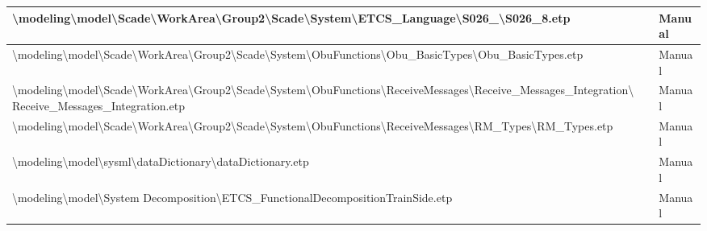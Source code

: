 \begin{longtable}{|>{\RaggedRight}p{}|>{\RaggedRight}p{}|>{\RaggedRight}p{}|}
\hline
\textbackslash \allowbreak modeling\textbackslash \allowbreak model\textbackslash \allowbreak Scade\textbackslash \allowbreak WorkArea\textbackslash \allowbreak Group2\textbackslash \allowbreak Scade\textbackslash \allowbreak System\textbackslash \allowbreak ETCS\_\allowbreak Language\textbackslash \allowbreak S026\_\allowbreak 8\textbackslash \allowbreak S026\_\allowbreak 8.etp& &Manual\\
\hline
\textbackslash \allowbreak modeling\textbackslash \allowbreak model\textbackslash \allowbreak Scade\textbackslash \allowbreak WorkArea\textbackslash \allowbreak Group2\textbackslash \allowbreak Scade\textbackslash \allowbreak System\textbackslash \allowbreak ObuFunctions\textbackslash \allowbreak Obu\_\allowbreak BasicTypes\textbackslash \allowbreak Obu\_\allowbreak BasicTypes.etp& &Manual\\
\hline
\textbackslash \allowbreak modeling\textbackslash \allowbreak model\textbackslash \allowbreak Scade\textbackslash \allowbreak WorkArea\textbackslash \allowbreak Group2\textbackslash \allowbreak Scade\textbackslash \allowbreak System\textbackslash \allowbreak ObuFunctions\textbackslash \allowbreak ReceiveMessages\textbackslash \allowbreak Receive\_\allowbreak Messages\_\allowbreak Integration\textbackslash \allowbreak Receive\_\allowbreak Messages\_\allowbreak Integration.etp& &Manual\\
\hline
\textbackslash \allowbreak modeling\textbackslash \allowbreak model\textbackslash \allowbreak Scade\textbackslash \allowbreak WorkArea\textbackslash \allowbreak Group2\textbackslash \allowbreak Scade\textbackslash \allowbreak System\textbackslash \allowbreak ObuFunctions\textbackslash \allowbreak ReceiveMessages\textbackslash \allowbreak RM\_\allowbreak Types\textbackslash \allowbreak RM\_\allowbreak Types.etp& &Manual\\
\hline
\textbackslash \allowbreak modeling\textbackslash \allowbreak model\textbackslash \allowbreak sysml\textbackslash \allowbreak dataDictionary\textbackslash \allowbreak dataDictionary.etp& &Manual\\
\hline
\textbackslash \allowbreak modeling\textbackslash \allowbreak model\textbackslash \allowbreak System Decomposition\textbackslash \allowbreak ETCS\_\allowbreak FunctionalDecompositionTrainSide.etp& &Manual\\
\hline
\end{longtable}
